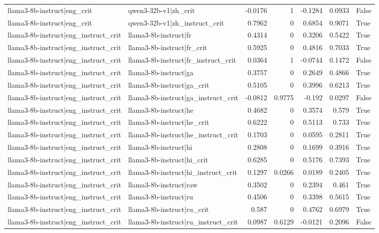 \begin{table}
\begin{tabular}{l l r r r r l}
llama3-8b-instruct|eng_crit & qwen3-32b-v1|zh_crit & -0.0176 & 1 & -0.1284 & 0.0933 & False \\
llama3-8b-instruct|eng_crit & qwen3-32b-v1|zh_instruct_crit & 0.7962 & 0 & 0.6854 & 0.9071 & True \\
llama3-8b-instruct|eng_instruct_crit & llama3-8b-instruct|fr & 0.4314 & 0 & 0.3206 & 0.5422 & True \\
llama3-8b-instruct|eng_instruct_crit & llama3-8b-instruct|fr_crit & 0.5925 & 0 & 0.4816 & 0.7033 & True \\
llama3-8b-instruct|eng_instruct_crit & llama3-8b-instruct|fr_instruct_crit & 0.0364 & 1 & -0.0744 & 0.1472 & False \\
llama3-8b-instruct|eng_instruct_crit & llama3-8b-instruct|ga & 0.3757 & 0 & 0.2649 & 0.4866 & True \\
llama3-8b-instruct|eng_instruct_crit & llama3-8b-instruct|ga_crit & 0.5105 & 0 & 0.3996 & 0.6213 & True \\
llama3-8b-instruct|eng_instruct_crit & llama3-8b-instruct|ga_instruct_crit & -0.0812 & 0.9775 & -0.192 & 0.0297 & False \\
llama3-8b-instruct|eng_instruct_crit & llama3-8b-instruct|he & 0.4682 & 0 & 0.3574 & 0.579 & True \\
llama3-8b-instruct|eng_instruct_crit & llama3-8b-instruct|he_crit & 0.6222 & 0 & 0.5113 & 0.733 & True \\
llama3-8b-instruct|eng_instruct_crit & llama3-8b-instruct|he_instruct_crit & 0.1703 & 0 & 0.0595 & 0.2811 & True \\
llama3-8b-instruct|eng_instruct_crit & llama3-8b-instruct|hi & 0.2808 & 0 & 0.1699 & 0.3916 & True \\
llama3-8b-instruct|eng_instruct_crit & llama3-8b-instruct|hi_crit & 0.6285 & 0 & 0.5176 & 0.7393 & True \\
llama3-8b-instruct|eng_instruct_crit & llama3-8b-instruct|hi_instruct_crit & 0.1297 & 0.0266 & 0.0189 & 0.2405 & True \\
llama3-8b-instruct|eng_instruct_crit & llama3-8b-instruct|raw & 0.3502 & 0 & 0.2394 & 0.461 & True \\
llama3-8b-instruct|eng_instruct_crit & llama3-8b-instruct|ru & 0.4506 & 0 & 0.3398 & 0.5615 & True \\
llama3-8b-instruct|eng_instruct_crit & llama3-8b-instruct|ru_crit & 0.587 & 0 & 0.4762 & 0.6979 & True \\
llama3-8b-instruct|eng_instruct_crit & llama3-8b-instruct|ru_instruct_crit & 0.0987 & 0.6129 & -0.0121 & 0.2096 & False \\

\end{tabular}
\end{table}
